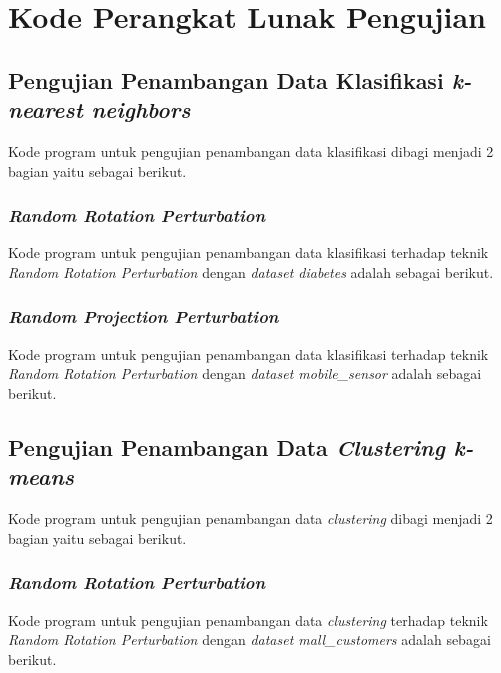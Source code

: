 \chapter{Kode Perangkat Lunak Pengujian}
\label{lamp:B}

\section{Pengujian Penambangan Data Klasifikasi \textit{k-nearest neighbors}}
\label{sec:pengujian-knn}

Kode program untuk pengujian penambangan data klasifikasi dibagi menjadi 2 bagian yaitu sebagai berikut.

\subsection{\textit{Random Rotation Perturbation}}
\label{subsec:knn-rotation-perturbation}
Kode program untuk pengujian penambangan data klasifikasi terhadap teknik \textit{Random Rotation Perturbation} dengan \textit{dataset diabetes} adalah sebagai berikut.


\subsection{\textit{Random Projection Perturbation}}
\label{subsec:knn-projection-perturbation}
Kode program untuk pengujian penambangan data klasifikasi terhadap teknik \textit{Random Rotation Perturbation} dengan \textit{dataset mobile\_sensor} adalah sebagai berikut.


\section{Pengujian Penambangan Data \textit{Clustering k-means}}
\label{sec:pengujian-kmeans}

Kode program untuk pengujian penambangan data \textit{clustering} dibagi menjadi 2 bagian yaitu sebagai berikut.

\subsection{\textit{Random Rotation Perturbation}}
\label{subsec:kmeans-rotation-perturbation}
Kode program untuk pengujian penambangan data \textit{clustering} terhadap teknik \textit{Random Rotation Perturbation} dengan \textit{dataset mall\_customers} adalah sebagai berikut.


